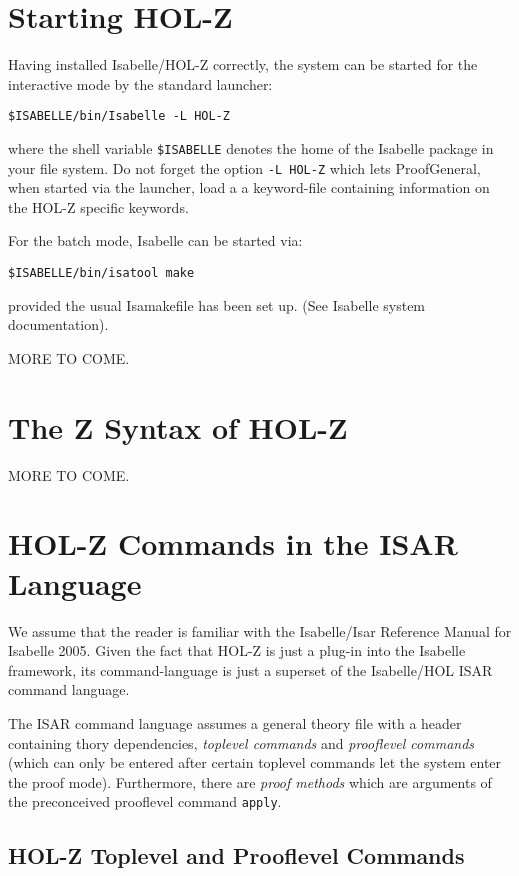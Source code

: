 \documentclass[10pt,a4paper,bigheadings,pdftex,bibtotoc,chapterprefix,appendixprefix,twoside,DIVcalc]{scrbook}
\begin{document}
\chapter{Starting HOL-Z}
Having installed Isabelle/HOL-Z correctly, the system can be started 
for the interactive mode by the standard launcher:

\begin{verbatim}
$ISABELLE/bin/Isabelle -L HOL-Z
\end{verbatim}

where the shell variable \verb+$ISABELLE+ denotes the home of the Isabelle
package in your file system. Do not forget the option  \verb+-L HOL-Z+ which
lets ProofGeneral, when started via the launcher, load a a keyword-file
containing information on the HOL-Z specific keywords.

For the batch mode, Isabelle can be started via:
\begin{verbatim}
$ISABELLE/bin/isatool make
\end{verbatim}
provided the usual Isamakefile has been set up. (See Isabelle system documentation).

MORE TO COME.

\chapter{The Z Syntax of HOL-Z}

MORE TO COME.

\chapter{HOL-Z Commands in the ISAR Language}
We assume that the reader is familiar with the Isabelle/Isar Reference Manual for
Isabelle 2005. Given the fact that HOL-Z is just a plug-in into the Isabelle 
framework, its command-language is just a superset of the Isabelle/HOL ISAR command language.

The ISAR command language assumes a general theory file with
a header containing thory dependencies, \emph{toplevel commands} and
\emph{prooflevel commands} (which can only be entered after certain toplevel commands
let the system enter the proof mode). Furthermore, there are \emph{proof methods} which
are arguments of the preconceived prooflevel command \verb+apply+.

\section{HOL-Z Toplevel and Prooflevel Commands}
\end{document}
